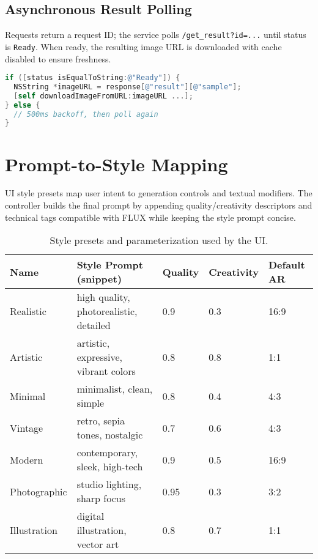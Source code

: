 \subsection{Asynchronous Result Polling}
Requests return a request ID; the service polls \texttt{/get\_result?id=...} until status is \texttt{Ready}. When ready, the resulting image URL is downloaded with cache disabled to ensure freshness.

\begin{lstlisting}[language=C, basicstyle=\ttfamily\small, caption={Polling and retrieval (abridged).}, label={lst:poll}]
if ([status isEqualToString:@"Ready"]) {
  NSString *imageURL = response[@"result"][@"sample"]; 
  [self downloadImageFromURL:imageURL ...];
} else {
  // 500ms backoff, then poll again
}
\end{lstlisting}

\section{Prompt-to-Style Mapping}\label{sec:style-mapping}
UI style presets map user intent to generation controls and textual modifiers. The controller builds the final prompt by appending quality/creativity descriptors and technical tags compatible with FLUX while keeping the style prompt concise.

\begin{table}[H]
\centering
\caption{Style presets and parameterization used by the UI.}
\label{tab:styles}
\begin{tabular}{P{2.7cm} P{4.2cm} P{1.6cm} P{1.8cm} P{1.6cm}}
\toprule
\textbf{Name} & \textbf{Style Prompt (snippet)} & \textbf{Quality} & \textbf{Creativity} & \textbf{Default AR} \\
\midrule
Realistic & high quality, photorealistic, detailed & 0.9 & 0.3 & 16:9 \\
Artistic & artistic, expressive, vibrant colors & 0.8 & 0.8 & 1:1 \\
Minimal & minimalist, clean, simple & 0.8 & 0.4 & 4:3 \\
Vintage & retro, sepia tones, nostalgic & 0.7 & 0.6 & 4:3 \\
Modern & contemporary, sleek, high-tech & 0.9 & 0.5 & 16:9 \\
Photographic & studio lighting, sharp focus & 0.95 & 0.3 & 3:2 \\
Illustration & digital illustration, vector art & 0.8 & 0.7 & 1:1 \\
\bottomrule
\end{tabular}
\end{table}

